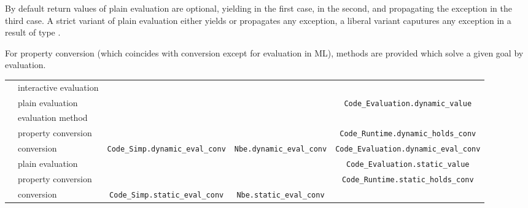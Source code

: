 \begin{isabellebody}
\begin{isamarkuptext}
  By default return values of plain evaluation are optional, yielding
   in the first case,  in the
  second, and propagating the exception in the third case.  A strict
  variant of plain evaluation either yields  or propagates
  any exception, a liberal variant caputures any exception in a result
  of type .
  
  For property conversion (which coincides with conversion except for
  evaluation in ML), methods are provided which solve a given goal by
  evaluation.%
\end{isamarkuptext}%
\isamarkuptrue%
%
\isamarkuptrue%
%
\begin{isamarkuptext}%
\newcommand{\ttsize}{\fontsize{5.8pt}{8pt}\selectfont}
  \fontsize{9pt}{12pt}\selectfont
  \begin{tabular}{ll||c|c|c}
    & & \isa{simp} & \isa{nbe} & \isa{code} \tabularnewline \hline \hline
    \multirow{5}{1ex}{\rotatebox{90}{dynamic}}
      & interactive evaluation 
      & \hyperlink{command.value}{\mbox{\isa{\isacommand{value}}}} \isa{{\isaliteral{5B}{\isacharbrackleft}}simp{\isaliteral{5D}{\isacharbrackright}}} & \hyperlink{command.value}{\mbox{\isa{\isacommand{value}}}} \isa{{\isaliteral{5B}{\isacharbrackleft}}nbe{\isaliteral{5D}{\isacharbrackright}}} & \hyperlink{command.value}{\mbox{\isa{\isacommand{value}}}} \isa{{\isaliteral{5B}{\isacharbrackleft}}code{\isaliteral{5D}{\isacharbrackright}}}
      \tabularnewline
    & plain evaluation & & & \ttsize\verb|Code_Evaluation.dynamic_value| \tabularnewline \cline{2-5}
    & evaluation method & \hyperlink{method.code-simp}{\mbox{\isa{code{\isaliteral{5F}{\isacharunderscore}}simp}}} & \hyperlink{method.normalization}{\mbox{\isa{normalization}}} & \hyperlink{method.eval}{\mbox{\isa{eval}}} \tabularnewline
    & property conversion & & & \ttsize\verb|Code_Runtime.dynamic_holds_conv| \tabularnewline \cline{2-5}
    & conversion & \ttsize\verb|Code_Simp.dynamic_eval_conv| & \ttsize\verb|Nbe.dynamic_eval_conv|
      & \ttsize\verb|Code_Evaluation.dynamic_eval_conv| \tabularnewline \hline \hline
    \multirow{3}{1ex}{\rotatebox{90}{static}}
      & plain evaluation & & & \ttsize\verb|Code_Evaluation.static_value| \tabularnewline \cline{2-5}
    & property conversion & &
      & \ttsize\verb|Code_Runtime.static_holds_conv| \tabularnewline \cline{2-5}
    & conversion & \ttsize\verb|Code_Simp.static_eval_conv|
      & \ttsize\verb|Nbe.static_eval_conv|

\end{tabular}
\end{isamarkuptext}
\end{isabellebody}
